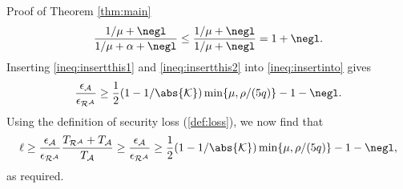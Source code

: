 \begin{namedproof}{Proof of Theorem \ref{thm:main}}
\begin{align}
    \frac{1/\mu + \negl}{1/\mu + \alpha + \negl} \le \frac{1/\mu + \negl}{1/\mu + \negl} = 1 + \negl.
  \end{align}
  Inserting \eqref{ineq:insertthis1} and \eqref{ineq:insertthis2} into \eqref{ineq:insertinto} gives
  \begin{align}
    \frac{\epsilon_{\advA}}{\epsilon_{\redR^{\advA}}} \ge \frac{1}{2}(1 - 1 / \abs{\keyspace}) \min \left\{ \mu, \rho / (5q) \right\} - 1 - \negl. \notag
  \end{align}
  Using the definition of security loss (\ref{def:loss}), we now find that
  \[
    \ell \ge \frac{\epsilon_{\advA}}{\epsilon_{\redR^{\advA}}}\frac{T_{\redR^{\advA}} + T_{\advA}}{T_{\advA}}
    \ge \frac{\epsilon_{\advA}}{\epsilon_{\redR^{\advA}}}
    \ge \frac{1}{2}(1 - 1 / \abs{\keyspace}) \min \left\{ \mu, \rho / (5q) \right\} - 1 - \negl, \notag
  \]
  as required.
\end{namedproof}


